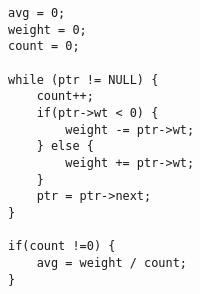 \begin{lstlisting}[style=CStyle]
avg = 0;
weight = 0;
count = 0;

while (ptr != NULL) {
	count++;
	if(ptr->wt < 0) {
		weight -= ptr->wt;
	} else {
		weight += ptr->wt;
	}
	ptr = ptr->next;
}

if(count !=0) {
	avg = weight / count;
}
\end{lstlisting}